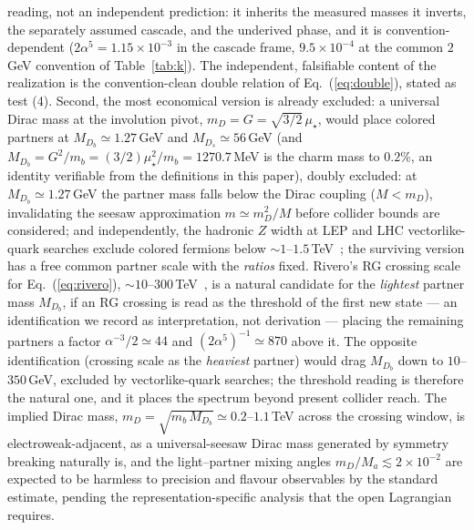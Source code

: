 \documentclass[11pt]{article}
\begin{document}
reading, not an independent prediction: it inherits the measured masses it
inverts, the separately assumed cascade, and the underived phase, and it is
convention-dependent ($2\alpha^5 = 1.15\times10^{-3}$ in the cascade frame,
$9.5\times10^{-4}$ at the common $2$\,GeV convention of Table~\ref{tab:k}).
The independent, falsifiable content of the realization is the
convention-clean double relation of Eq.~(\ref{eq:double}), stated as test (4). Second, the most economical version is already
excluded: a universal Dirac mass at the involution pivot, $m_D = G =
\sqrt{3/2}\,\mu_\star$, would place colored partners at $M_{D_b} \simeq 1.27$\,GeV and $M_{D_s} \simeq 56$\,GeV (and $M_{D_b} = G^2/m_b = (3/2)\mu_\star^2/m_b = 1270.7$\,MeV is the charm mass to $0.2\%$, an identity verifiable from the definitions in this paper), doubly excluded: at $M_{D_b} \simeq 1.27$\,GeV the partner mass falls below the Dirac coupling ($M < m_D$), invalidating the seesaw approximation $m \simeq m_D^2/M$ before collider bounds are considered; and independently, the hadronic $Z$ width at LEP and LHC vectorlike-quark searches exclude colored fermions below $\sim 1$--$1.5$\,TeV~\cite{PDG}; the
surviving version has a free common partner scale with the \emph{ratios} fixed.
Rivero's RG crossing scale for Eq.~(\ref{eq:rivero}), $\sim 10$--$300$\,TeV~\cite{Rivero2026}, is a natural candidate for the \emph{lightest} partner mass $M_{D_b}$, if an RG crossing is read as the threshold of the first new state --- an identification we record as interpretation, not derivation --- placing the remaining partners a factor $\alpha^{-3}/2 \simeq 44$ and $(2\alpha^5)^{-1} \simeq 870$ above it. The opposite identification (crossing scale as the \emph{heaviest} partner) would drag $M_{D_b}$ down to $10$--$350$\,GeV, excluded by vectorlike-quark searches; the threshold reading is therefore the natural one, and it places the spectrum beyond present collider reach. The implied Dirac mass, $m_D = \sqrt{m_b\,M_{D_b}} \simeq 0.2$--$1.1$\,TeV across the crossing window, is electroweak-adjacent, as a universal-seesaw Dirac mass generated by symmetry breaking naturally is, and the light--partner mixing angles $m_D/M_a \lesssim 2\times10^{-2}$ are expected to be harmless to precision and flavour observables by the standard estimate, pending the representation-specific analysis that the open Lagrangian requires.
\end{document}
